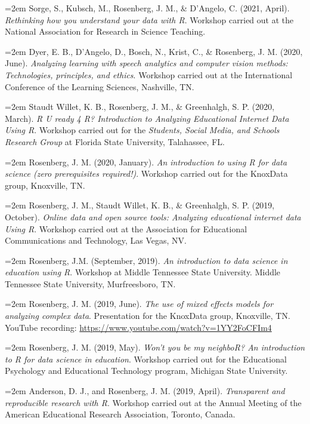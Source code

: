 \documentclass[
  14,
]{article}
\begin{document}
\hangindent=2em Sorge, S., Kubsch, M., Rosenberg, J. M., \& D'Angelo, C.
(2021, April). \emph{Rethinking how you understand your data with R}.
Workshop carried out at the National Association for Research in Science
Teaching.

\hangindent=2em Dyer, E. B., D'Angelo, D., Bosch, N., Krist, C., \&
Rosenberg, J. M. (2020, June). \emph{Analyzing learning with speech
analytics and computer vision methods: Technologies, principles, and
ethics}. Workshop carried out at the International Conference of the
Learning Sciences, Nashville, TN.

\hangindent=2em Staudt Willet, K. B., Rosenberg, J. M., \& Greenhalgh,
S. P. (2020, March). \emph{R U ready 4 R? Introduction to Analyzing
Educational Internet Data Using R}. Workshop carried out for the
\emph{Students, Social Media, and Schools Research Group} at Florida
State University, Talahassee, FL.

\hangindent=2em Rosenberg, J. M. (2020, January). \emph{An introduction
to using R for data science (zero prerequisites required!)}. Workshop
carried out for the KnoxData group, Knoxville, TN.

\hangindent=2em Rosenberg, J. M., Staudt Willet, K. B., \& Greenhalgh,
S. P. (2019, October). \emph{Online data and open source tools:
Analyzing educational internet data Using R}. Workshop carried out at
the Association for Educational Communications and Technology, Las
Vegas, NV.

\hangindent=2em Rosenberg, J.M. (September, 2019). \emph{An introduction
to data science in education using R}. Workshop at Middle Tennessee
State University. Middle Tennessee State University, Murfreesboro, TN.

\hangindent=2em Rosenberg, J. M. (2019, June). \emph{The use of mixed
effects models for analyzing complex data}. Presentation for the
KnoxData group, Knoxville, TN. YouTube recording:
\url{https://www.youtube.com/watch?v=1YY2FoCFIm4}

\hangindent=2em Rosenberg, J. M. (2019, May). \emph{Won't you be my
neighboR? An introduction to R for data science in education}. Workshop
carried out for the Educational Psychology and Educational Technology
program, Michigan State University.

\hangindent=2em Anderson, D. J., and Rosenberg, J. M. (2019, April).
\emph{Transparent and reproducible research with R}. Workshop carried
out at the Annual Meeting of the American Educational Research
Association, Toronto, Canada.
\end{document}
